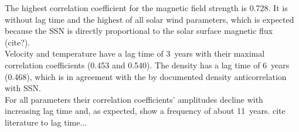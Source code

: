 The highest correlation coefficient for the magnetic field strength is 0.728. It is without lag time and the highest of all solar wind parameters, which is expected because the SSN is directly proportional to the solar surface magnetic flux (cite?).\\
Velocity and temperature have a lag time of 3~years with their maximal correlation coefficients (0.453 and 0.540). The density has a lag time of 6~years (0.468), which is in agreement with the by \citet{Bougeret1984} documented density anticorrelation with SSN.\\	%

For all parameters their correlation coefficients' amplitudes decline with increasing lag time and, as expected, show a frequency of about 11~years.
cite literature to lag time...\\

